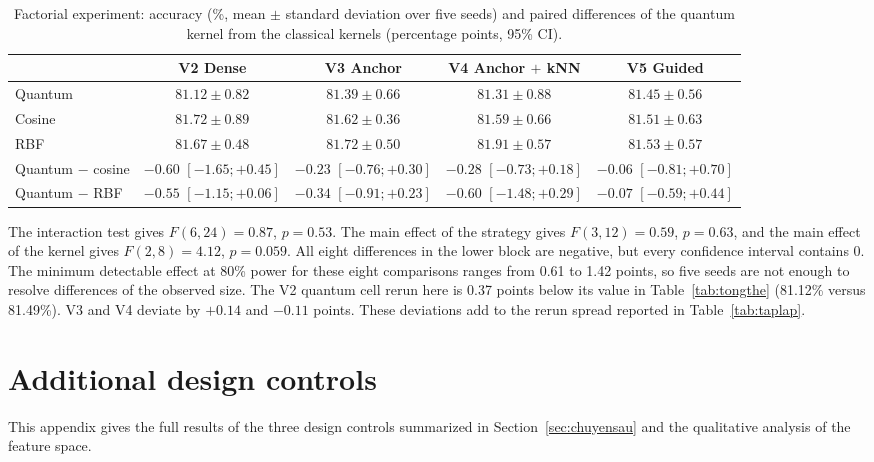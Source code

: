 \begin{table}[!htbp]
\centering
\caption{Factorial experiment: accuracy (\%, mean $\pm$ standard deviation
over five seeds) and paired differences of the quantum kernel from the
classical kernels (percentage points, 95\% CI).}
\label{tab:giaithua}
\footnotesize
\setlength{\tabcolsep}{4pt}
\begin{tabular}{lcccc}
\toprule
 & \textbf{V2 Dense} & \textbf{V3 Anchor} & \textbf{V4 Anchor $+$ kNN} & \textbf{V5 Guided} \\
\midrule
Quantum & $81.12 \pm 0.82$ & $81.39 \pm 0.66$ & $81.31 \pm 0.88$ & $81.45 \pm 0.56$ \\
Cosine & $81.72 \pm 0.89$ & $81.62 \pm 0.36$ & $81.59 \pm 0.66$ & $81.51 \pm 0.63$ \\
RBF & $81.67 \pm 0.48$ & $81.72 \pm 0.50$ & $81.91 \pm 0.57$ & $81.53 \pm 0.57$ \\
\midrule
Quantum $-$ cosine & $-0.60$ $[-1.65; +0.45]$ & $-0.23$ $[-0.76; +0.30]$ & $-0.28$ $[-0.73; +0.18]$ & $-0.06$ $[-0.81; +0.70]$ \\
Quantum $-$ RBF & $-0.55$ $[-1.15; +0.06]$ & $-0.34$ $[-0.91; +0.23]$ & $-0.60$ $[-1.48; +0.29]$ & $-0.07$ $[-0.59; +0.44]$ \\
\bottomrule
\end{tabular}
\end{table}

The interaction test gives $F(6, 24) = 0.87$, $p = 0.53$. The main effect
of the strategy gives $F(3, 12) = 0.59$, $p = 0.63$, and the main effect of
the kernel gives $F(2, 8) = 4.12$, $p = 0.059$. All eight differences in
the lower block are negative, but every confidence interval contains 0.
The minimum detectable effect at 80\% power for these eight comparisons
ranges from 0.61 to 1.42 points, so five seeds are not enough to resolve
differences of the observed size. The V2 quantum cell rerun here is 0.37
points below its value in Table~\ref{tab:tongthe} (81.12\% versus
81.49\%). V3 and V4 deviate by $+0.14$ and $-0.11$ points. These deviations
add to the rerun spread reported in Table~\ref{tab:taplap}.

\section{Additional design controls}
\label{app:doichung}

This appendix gives the full results of the three design controls
summarized in Section~\ref{sec:chuyensau} and the qualitative analysis of
the feature space.

